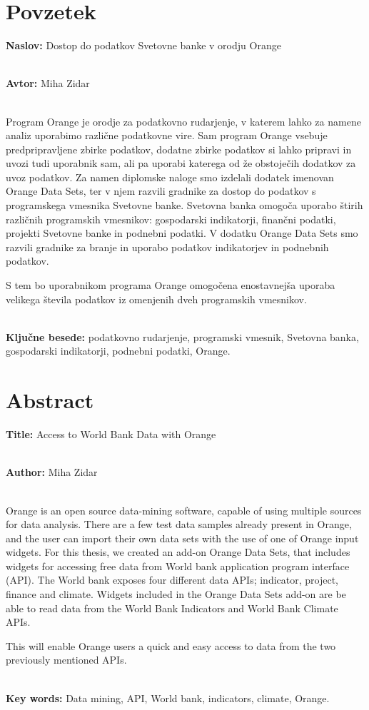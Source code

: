 \chapter*{Povzetek}


\textbf{Naslov:} Dostop do podatkov Svetovne banke v orodju Orange

\ \\
\textbf{Avtor:} Miha Zidar

\ \\
Program Orange je orodje za podatkovno rudarjenje, v katerem
lahko za namene analiz uporabimo različne podatkovne vire. Sam program Orange
vsebuje predpripravljene zbirke podatkov, dodatne zbirke podatkov si lahko 
pripravi in uvozi tudi uporabnik sam, ali pa uporabi katerega od že obstoječih
dodatkov za uvoz podatkov. Za namen diplomske naloge smo izdelali dodatek imenovan
Orange Data Sets, ter v njem razvili gradnike za dostop do podatkov s programskega 
vmesnika Svetovne banke. Svetovna banka omogoča uporabo štirih 
različnih programskih vmesnikov: gospodarski indikatorji, finančni podatki,
projekti Svetovne banke in podnebni podatki. V dodatku Orange Data Sets smo
razvili gradnike za branje in uporabo podatkov indikatorjev 
in podnebnih podatkov.

S tem bo uporabnikom programa Orange omogočena enostavnejša uporaba velikega števila
podatkov iz omenjenih dveh programskih vmesnikov.

\ \\
\textbf{Ključne besede:} podatkovno rudarjenje, programski vmesnik, 
Svetovna banka, gospodarski indikatorji, podnebni podatki, Orange. 




\clearemptydoublepage

\chapter*{Abstract}


\textbf{Title:} Access to World Bank Data with Orange

\ \\
\textbf{Author:} Miha Zidar

\ \\
Orange is an open source data-mining software, capable of using multiple sources for data analysis. There are a few test data samples already present in Orange, and the user can import their own data sets with the use of one of Orange input widgets. For this thesis, we created an add-on Orange Data Sets, that includes widgets for accessing free data from World bank application program interface (API). The World bank exposes four different data APIs; indicator, project, finance and climate. Widgets included in the Orange Data Sets add-on are be able to read data from the World Bank Indicators and World Bank Climate APIs.

This will enable Orange users a quick and easy access to data from the two previously mentioned APIs.

\ \\
\textbf{Key words:} Data mining, API, World bank, indicators, climate, Orange.

